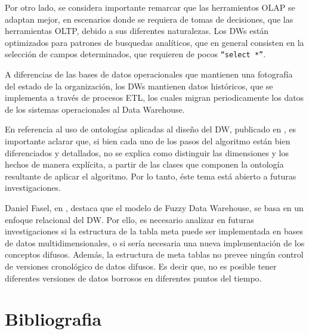 \documentclass[a4paper,11pt]{article}
\begin{document}
  Por otro lado, se considera importante remarcar que las herramientos OLAP se adaptan mejor, en escenarios donde se requiera de tomas de decisiones,
  que las herramientas OLTP, debido a sus diferentes naturalezas.
  Los DWs están optimizados para patrones de busquedas analíticos, que en general consisten en la selección de campos determinados, que requieren de pocos
  \texttt{``select *''}.
  
  A diferencias de las bases de datos operacionales que mantienen una fotografía del estado
  de la organización, los DWs mantienen datos históricos, que se implementa a través de procesos ETL, los cuales migran periodicamente los datos de los sistemas
  operacionales al Data Warehouse.
  
  En referencia al uso de ontologías aplicadas al diseño del DW, publicado en \cite{ontologias}, es importante aclarar que, si bien cada uno de los pasos del
  algoritmo están bien diferenciados y detallados, no se explica como distinguir las dimensiones y los hechos de manera explícita, a partir de las clases
  que componen la ontología resultante de aplicar el algoritmo. Por lo tanto, éste tema está abierto a futuras investigaciones.
  
  Daniel Fasel, en \cite {Fasel14}, destaca que el modelo de Fuzzy Data Warehouse, se basa en un enfoque relacional del DW.
  Por ello, es necesario analizar en futuras investigaciones si la estructura de la tabla meta puede ser implementada en bases de datos multidimensionales,
  o si sería necesaria una nueva implementación de los conceptos difusos.
  Además, la estructura de meta tablas no prevee ningún control de versiones cronológico de datos difusos.
  Es decir que, no es posible tener diferentes versiones de datos borrosos en diferentes puntos del tiempo.
  
  


  \section{Bibliografia}

  \printbibliography

  
  
  \printindex %
  
\end{document}
